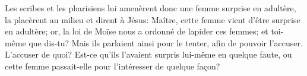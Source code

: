 Les scribes et les pharisiens lui amenèrent donc une femme surprise en adultère,
	la placèrent au milieu et dirent à Jésus:
	Maître, cette femme vient d’être surprise en adultère;
	or, la loi de Moïse nous a ordonné de lapider ces femmes;
	et toi-même que dis-tu?
Mais ils parlaient ainsi pour le tenter, afin de pouvoir l’accuser.
L’accuser de quoi?
	Est-ce qu’ils l’avaient surpris lui-même en quelque faute,
	ou cette femme passait-elle pour l’intéresser de quelque façon?
